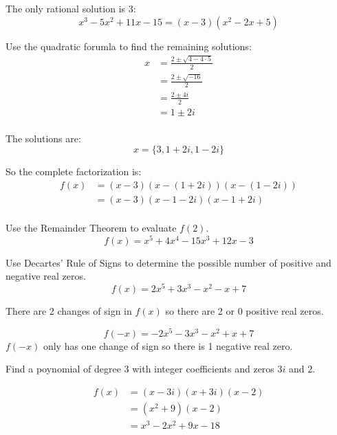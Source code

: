 \documentclass[fleqn,addpoints]{exam}
\begin{document}
\begin{questions}
\begin{solution}
      The only rational solution is 3:
      \[
        x^3 - 5x^2 + 11x - 15 = (x - 3) (x^2 - 2x + 5) 
      \]

      Use the quadratic forumla to find the remaining solutions:
      \begin{align*}
        x &= \frac{2 \pm \sqrt{4 - 4 \cdot 5}}{2} \\
          &= \frac{2 \pm \sqrt{-16}}{2} \\
          &= \frac{2 \pm 4i}{2} \\
          &= 1 \pm 2i \\
      \end{align*}
      
      The solutions are:
      \[
        x = \{ 3, 1 + 2i, 1 - 2i \}
      \]

      So the complete factorization is:
      \begin{align*}
        f(x) &= (x - 3)(x - (1 + 2i))(x - (1 - 2i)) \\
             &= (x - 3)(x - 1 - 2i)(x - 1 + 2i) \\
      \end{align*}

    \end{solution}

    \question[5] Use the Remainder Theorem to evaluate $f(2)$.
      \[
        f(x) = x^5 + 4x^4 - 15x^3 + 12x - 3
      \]

    \question[5] Use Decartes' Rule of Signs to determine the possible number of positive and negative real zeros.
      \[
        f(x) = 2x^5 + 3x^3 - x^2 - x + 7
      \]

      \begin{solution}
        There are 2 changes of sign in $f(x)$ so there are 2 or 0 positive real zeros.

        \[
          f(-x) = -2x^5 - 3x^3 - x^2 + x + 7
        \]
        $f(-x)$ only has one change of sign so there is 1 negative real zero.

      \end{solution}


    \question[7] Find a poynomial of degree 3 with integer coefficients and zeros $3i$ and $2$.
    \begin{solution}
      \begin{align*}
        f(x) &= (x - 3i)(x + 3i)(x - 2) \\
             &= (x^2 + 9)(x - 2) \\
             &= x^3 - 2x^2 + 9x - 18 \\
      \end{align*}
    \end{solution}


\end{questions}
\end{document}
